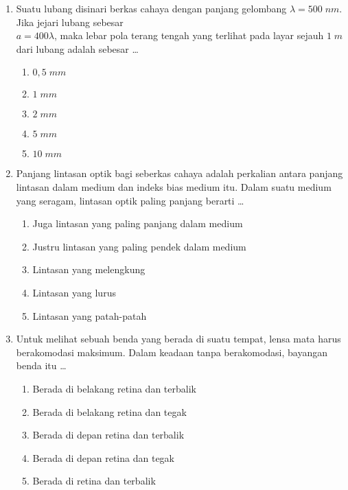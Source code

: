 \documentclass[A4,12PT, english, twocolumn]{journal}
\begin{document}
\begin{enumerate}
\item Suatu lubang disinari berkas cahaya dengan panjang gelombang $\lambda = 500 \; nm$. Jika jejari lubang sebesar \\ $a = 400\lambda$, maka lebar pola terang tengah yang terlihat pada layar sejauh $1 \; m$ dari lubang adalah sebesar \dots
\begin{enumerate}
        \item $0,5 \; mm$
        \item $1 \; mm$
        \item $2 \; mm$
        \item $5 \; mm$
        \item $10 \; mm$
    \end{enumerate}

\item Panjang lintasan optik bagi seberkas cahaya adalah perkalian antara panjang lintasan dalam medium dan indeks bias medium itu. Dalam suatu medium yang seragam, lintasan optik paling panjang berarti \dots
    \begin{enumerate}
        \item Juga lintasan yang paling panjang dalam medium
        \item Justru lintasan yang paling pendek dalam medium
        \item Lintasan yang melengkung
        \item Lintasan yang lurus
        \item Lintasan yang patah-patah
    \end{enumerate}

\item Untuk melihat sebuah benda yang berada di suatu tempat, lensa mata harus berakomodasi maksimum. Dalam keadaan tanpa berakomodasi, bayangan benda itu \dots
    \begin{enumerate}
        \item Berada di belakang retina dan terbalik
        \item Berada di belakang retina dan tegak
        \item Berada di depan retina dan terbalik
        \item Berada di depan retina dan tegak
        \item Berada di retina dan terbalik
    \end{enumerate}


\end{enumerate}
\end{document}
